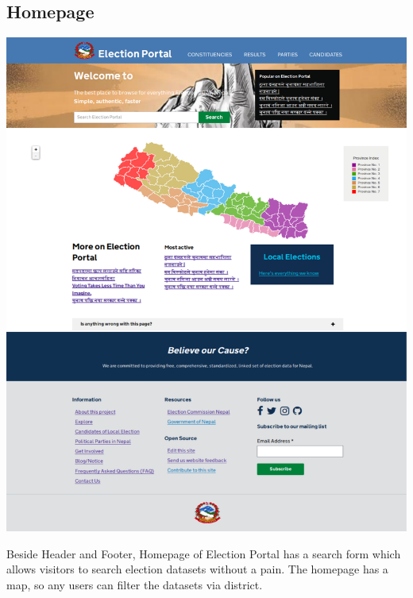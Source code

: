 \documentclass[12pt, a4paper, titlepage]{report}
\begin{document}
\subsection{Homepage}
\begin{center}
\includegraphics[scale=0.25]{Homepage.png}\\
\end{center}

Beside Header and Footer, Homepage of Election Portal has a search form which allows visitors to search election datasets without a pain. The homepage has a map, so any users can filter the datasets via district.
\newpage
\end{document}
